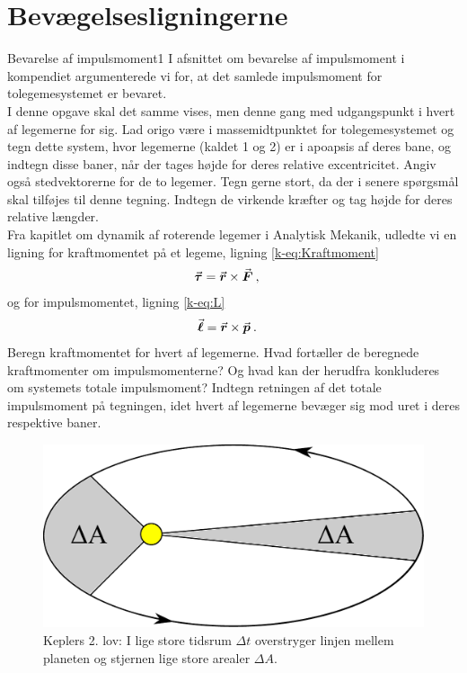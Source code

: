 \section*{Bevægelsesligningerne}
%
%
\begin{opgave}{Bevarelse af impulsmoment}{1} \label{opg:Bevarelse_af_impulsmoment}
I afsnittet om bevarelse af impulsmoment i kompendiet argumenterede vi for, at det samlede impulsmoment for tolegemesystemet er bevaret.\\
I denne opgave skal det samme vises, men denne gang med udgangspunkt i hvert af legemerne for sig.
%
\opg Lad origo være i massemidtpunktet for tolegemesystemet og tegn dette system, hvor legemerne (kaldet 1 og 2) er i apoapsis af deres bane, og indtegn disse baner, når der tages højde for deres relative excentricitet. Angiv også stedvektorerne for de to legemer. Tegn gerne stort, da der i senere spørgsmål skal tilføjes til denne tegning.
%
\opg Indtegn de virkende kræfter og tag højde for deres relative længder.\\[2.5mm]
%
Fra kapitlet om dynamik af roterende legemer i Analytisk Mekanik, udledte vi en ligning for kraftmomentet på et legeme, ligning \eqref{k-eq:Kraftmoment}
\begin{align*}
	{\vec{\boldsymbol{\tau}}} &= {\vec{\boldsymbol{r}}} \times {\vec{\boldsymbol{F}}} \: ,
\end{align*}
og for impulsmomentet, ligning \eqref{k-eq:L}
\begin{align*}
	{\vec{\boldsymbol{\ell}}} &= {\vec{\boldsymbol{r}}} \times {\vec{\boldsymbol{p}}} \: .
\end{align*}
%
\opg Beregn kraftmomentet for hvert af legemerne.
%
\opg Hvad fortæller de beregnede kraftmomenter om impulsmomenterne? Og hvad kan der herudfra konkluderes om systemets totale impulsmoment?
%
\opg Indtegn retningen af det totale impulsmoment på tegningen, idet hvert af legemerne bevæger sig mod uret i deres respektive baner.
\end{opgave}
%
%
\begin{figure}[h!]
	\centering
	\includegraphics[width=\columnwidth]{Planetbevaegelse/Kepler2.pdf}
	\caption{Keplers 2. lov: I lige store tidsrum $\Delta t$ overstryger linjen mellem planeten og stjernen lige store arealer $\Delta A$.}
	\label{fig:Kepler2}
\end{figure}
